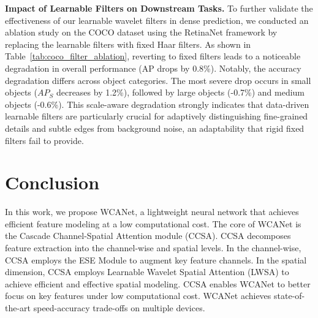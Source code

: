 \documentclass[a4paper,fleqn]{cas-dc}
\begin{document}
{\textbf{Impact of Learnable Filters on Downstream Tasks.} To further validate the effectiveness of our learnable wavelet filters in dense prediction, we conducted an ablation study on the COCO dataset using the RetinaNet framework by replacing the learnable filters with fixed Haar filters. As shown in Table~\ref{tab:coco_filter_ablation}, reverting to fixed filters leads to a noticeable degradation in overall performance (AP drops by 0.8\%). Notably, the accuracy degradation differs across object categories. The most severe drop occurs in small objects ($AP_S$ decreases by 1.2\%), followed by large objects (-0.7\%) and medium objects (-0.6\%). This scale-aware degradation strongly indicates that data-driven learnable filters are particularly crucial for adaptively distinguishing fine-grained details and subtle edges from background noise, an adaptability that rigid fixed filters fail to provide.}




\section{Conclusion}


In this work, we propose WCANet, a lightweight neural network that achieves efficient feature modeling at a low computational cost. The core of WCANet is the Cascade Channel-Spatial Attention module (CCSA).  CCSA decomposes feature extraction into the channel-wise and spatial levels. In the channel-wise, CCSA employs the ESE Module to augment key feature channels. In the spatial dimension, CCSA employs Learnable Wavelet Spatial Attention (LWSA) to achieve efficient and effective spatial modeling. CCSA enables WCANet to better focus on key features under low computational cost. WCANet achieves state-of-the-art speed-accuracy trade-offs on multiple devices.
\end{document}
